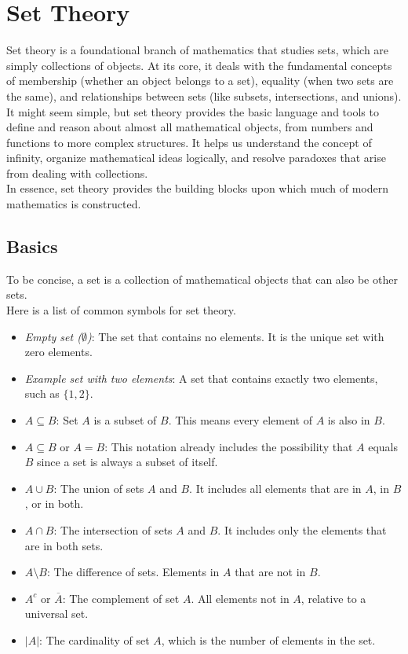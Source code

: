 \section{Set Theory}
Set theory is a foundational branch of mathematics that studies sets, which are simply collections of objects. At its core, it deals with the fundamental concepts of membership (whether an object belongs to a set), equality (when two sets are the same), and relationships between sets (like subsets, intersections, and unions).\\
It might seem simple, but set theory provides the basic language and tools to define and reason about almost all mathematical objects, from numbers and functions to more complex structures. It helps us understand the concept of infinity, organize mathematical ideas logically, and resolve paradoxes that arise from dealing with collections.\\
In essence, set theory provides the building blocks upon which much of modern mathematics is constructed.

\subsection{Basics}
To be concise, a set is a collection of mathematical objects that can also be other sets.\\
Here is a list of common symbols for set theory.

\begin{itemize}[label=\(-\)]
	\item \emph{Empty set (\(\emptyset\))}: The set that contains no elements. It is the unique set with zero elements.

	\item \emph{Example set with two elements}: A set that contains exactly two elements, such as \(\{1, 2\}\).

	\item \(A \subseteq B\): Set \(A\) is a subset of \(B\). This means every element of \(A\) is also in \(B\).

	\item \(A \subseteq B\) or \(A = B\): This notation already includes the possibility that \(A\) equals \(B\) since a set is always a subset of itself.

	\item \(A \cup B\): The union of sets \(A\) and \(B\). It includes all elements that are in \(A\), in \(B\), or in both.

	\item \(A \cap B\): The intersection of sets \(A\) and \(B\). It includes only the elements that are in both sets.

	\item \(A \setminus B\): The difference of sets. Elements in \(A\) that are not in \(B\).

	\item \(A^c\) or \(\overline{A}\): The complement of set \(A\). All elements not in \(A\), relative to a universal set.

	\item \(|A|\): The cardinality of set \(A\), which is the number of elements in the set.
\end{itemize}

